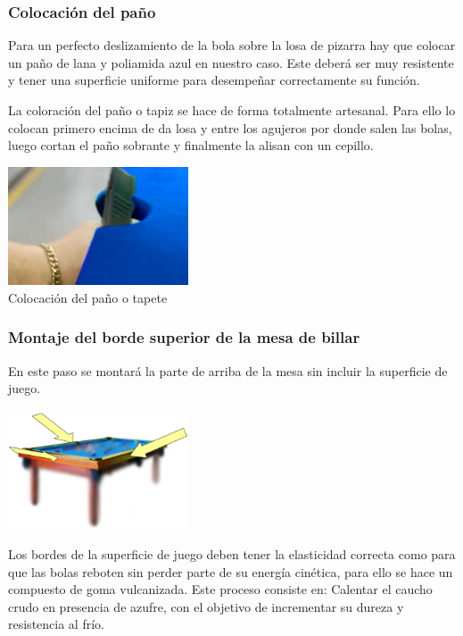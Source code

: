 		\subsubsection {Colocación del paño}
  	
 	Para un perfecto deslizamiento de la bola sobre la losa de pizarra hay que colocar un paño de lana y poliamida azul en nuestro caso. Este deberá ser muy resistente y tener una superficie uniforme para desempeñar correctamente su función.

	La coloración del paño o tapiz se hace de forma totalmente artesanal. Para ello lo colocan primero encima de da losa y entre los agujeros por donde salen las bolas, luego cortan el paño sobrante y finalmente la alisan con un cepillo. 

	\begin{center}
    			\includegraphics[width=0.4\textwidth]{Pantallazo.png}
			    \\ \small {Colocación del paño o tapete}
		\end{center}
\clearpage
		\subsubsection {Montaje del  borde superior de la mesa de billar}

	En este paso se montará la parte de arriba de la mesa  sin incluir la superficie de juego.

	\begin{center}
    		\includegraphics[width=0.4\textwidth]{P1.png}
	\end{center}
	
	Los bordes de la superficie de juego deben tener la elasticidad correcta como para que las bolas reboten sin perder parte de su energía cinética, para ello se hace un compuesto de goma vulcanizada. Este proceso consiste en:
Calentar el caucho crudo en presencia de azufre, con el objetivo de incrementar su dureza y resistencia al frío.


